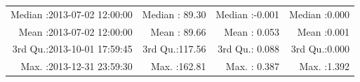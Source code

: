 \documentclass[
  10pt,
  a4paper,oneside]{article}
\begin{document}
\begin{longtable}[]{@{}rrrr@{}}
\begin{minipage}[t]{0.33\columnwidth}
Median :2013-07-02 12:00:00\strut
\end{minipage} & \begin{minipage}[t]{0.19\columnwidth}\raggedleft
Median : 89.30\strut
\end{minipage} & \begin{minipage}[t]{0.19\columnwidth}\raggedleft
Median :-0.001\strut
\end{minipage} & \begin{minipage}[t]{0.19\columnwidth}\raggedleft
Median :0.000\strut
\end{minipage}\tabularnewline
\begin{minipage}[t]{0.33\columnwidth}\raggedleft
Mean :2013-07-02 12:00:00\strut
\end{minipage} & \begin{minipage}[t]{0.19\columnwidth}\raggedleft
Mean : 89.66\strut
\end{minipage} & \begin{minipage}[t]{0.19\columnwidth}\raggedleft
Mean : 0.053\strut
\end{minipage} & \begin{minipage}[t]{0.19\columnwidth}\raggedleft
Mean :0.001\strut
\end{minipage}\tabularnewline
\begin{minipage}[t]{0.33\columnwidth}\raggedleft
3rd Qu.:2013-10-01 17:59:45\strut
\end{minipage} & \begin{minipage}[t]{0.19\columnwidth}\raggedleft
3rd Qu.:117.56\strut
\end{minipage} & \begin{minipage}[t]{0.19\columnwidth}\raggedleft
3rd Qu.: 0.088\strut
\end{minipage} & \begin{minipage}[t]{0.19\columnwidth}\raggedleft
3rd Qu.:0.000\strut
\end{minipage}\tabularnewline
\begin{minipage}[t]{0.33\columnwidth}\raggedleft
Max. :2013-12-31 23:59:30\strut
\end{minipage} & \begin{minipage}[t]{0.19\columnwidth}\raggedleft
Max. :162.81\strut
\end{minipage} & \begin{minipage}[t]{0.19\columnwidth}\raggedleft
Max. : 0.387\strut
\end{minipage} & \begin{minipage}[t]{0.19\columnwidth}\raggedleft
Max. :1.392\strut
\end{minipage}\tabularnewline

\end{longtable}
\end{document}
